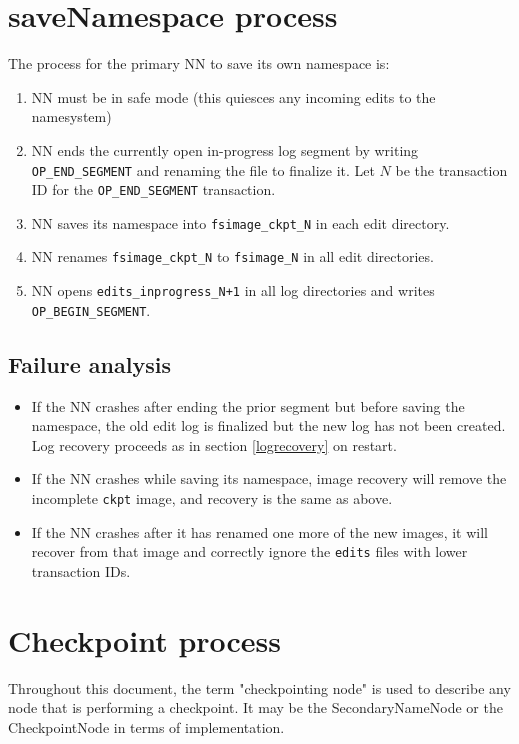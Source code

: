 \documentclass{article}
\begin{document}
\section{saveNamespace process}

The process for the primary NN to save its own namespace is:

\begin{enumerate}
\item NN must be in safe mode (this quiesces any incoming edits to the namesystem)
\item NN ends the currently open in-progress log segment by writing {\tt OP\_END\_SEGMENT} and renaming the file to finalize it.
Let $N$ be the transaction ID for the {\tt OP\_END\_SEGMENT} transaction.
\item NN saves its namespace into {\tt fsimage\_ckpt\_N} in each edit directory.
\item NN renames {\tt fsimage\_ckpt\_N} to {\tt fsimage\_N} in all edit directories.
\item NN opens {\tt edits\_inprogress\_N+1} in all log directories and writes {\tt OP\_BEGIN\_SEGMENT}.
\end{enumerate}

\subsection{Failure analysis}

\begin{itemize}
\item If the NN crashes after ending the prior segment but before saving the namespace,
the old edit log is finalized but the new log has not been created.
Log recovery proceeds as in section \ref{logrecovery} on restart.
\item If the NN crashes while saving its namespace, image recovery will remove the incomplete {\tt ckpt} image, and recovery is the same as above.
\item If the NN crashes after it has renamed one more of the new images, it will recover from that image and correctly ignore the {\tt edits} files with lower transaction IDs.
\end{itemize}

\section{Checkpoint process}

Throughout this document, the term "checkpointing node" is used to describe any node that is performing a checkpoint. It may be the SecondaryNameNode or the CheckpointNode in terms of implementation.
\end{document}
